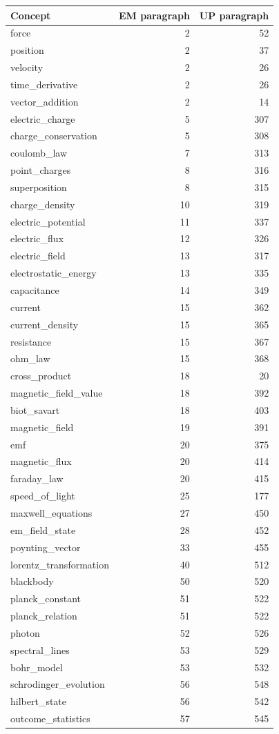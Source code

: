 \begin{longtable}{@{}lrr@{}}\toprule
Concept & EM paragraph & UP paragraph \\\midrule\endhead
force & 2 & 52 \\
position & 2 & 37 \\
velocity & 2 & 26 \\
time\_derivative & 2 & 26 \\
vector\_addition & 2 & 14 \\
electric\_charge & 5 & 307 \\
charge\_conservation & 5 & 308 \\
coulomb\_law & 7 & 313 \\
point\_charges & 8 & 316 \\
superposition & 8 & 315 \\
charge\_density & 10 & 319 \\
electric\_potential & 11 & 337 \\
electric\_flux & 12 & 326 \\
electric\_field & 13 & 317 \\
electrostatic\_energy & 13 & 335 \\
capacitance & 14 & 349 \\
current & 15 & 362 \\
current\_density & 15 & 365 \\
resistance & 15 & 367 \\
ohm\_law & 15 & 368 \\
cross\_product & 18 & 20 \\
magnetic\_field\_value & 18 & 392 \\
biot\_savart & 18 & 403 \\
magnetic\_field & 19 & 391 \\
emf & 20 & 375 \\
magnetic\_flux & 20 & 414 \\
faraday\_law & 20 & 415 \\
speed\_of\_light & 25 & 177 \\
maxwell\_equations & 27 & 450 \\
em\_field\_state & 28 & 452 \\
poynting\_vector & 33 & 455 \\
lorentz\_transformation & 40 & 512 \\
blackbody & 50 & 520 \\
planck\_constant & 51 & 522 \\
planck\_relation & 51 & 522 \\
photon & 52 & 526 \\
spectral\_lines & 53 & 529 \\
bohr\_model & 53 & 532 \\
schrodinger\_evolution & 56 & 548 \\
hilbert\_state & 56 & 542 \\
outcome\_statistics & 57 & 545 \\
\bottomrule\end{longtable}
